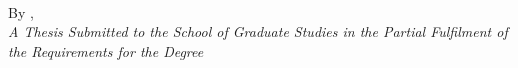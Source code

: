 \documentclass[
11pt, %
oneside, %
english, %
doublespacing
]{McMasterThesis} %
\begin{document}
\begin{center}

\vfill
\textsc{\Large \ttitle} \\

\vfill
By \authorname, \\%



 
 \vfill
{\large \textit{A Thesis Submitted to the School of Graduate Studies in the Partial Fulfilment of the Requirements for the Degree \degreename}}\\



\end{center}
\end{document}
